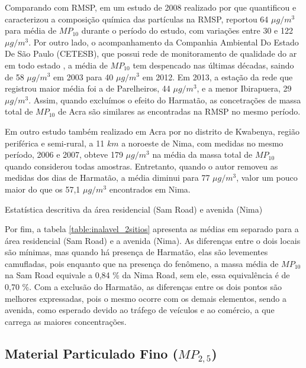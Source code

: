 Comparando com RMSP, em um estudo de 2008 realizado por \citet{souza2014}
que quantificou e caracterizou a composição química das partículas na RMSP,
reportou 64 $\mu g / m^3$ para média de $MP_{10}$ durante o período do estudo, 
com variações entre 30 e 122 $\mu g / m^3$. Por outro lado, o acompanhamento 
da Companhia Ambiental Do Estado De São Paulo (CETESB), que possui 
rede de monitoramento de qualidade do ar em todo estado \citep{cetesb2014}, 
a média de $MP_{10}$ tem despencado nas últimas décadas, saindo de 58 
$\mu g / m^3$ em 2003 para 40 $\mu g / m^3$ em 2012. Em 2013, a estação da rede
que registrou maior média foi a de Parelheiros, 44 $\mu g / m^3$, e a menor 
Ibirapuera, 29 $\mu g / m^3$. Assim, quando excluímos o efeito do Harmatão, 
as concetrações de massa total de $MP_{10}$ de Acra são similares as encontradas
na RMSP no mesmo período.

Em outro estudo também realizado em Acra por \citet{aboh2009} no distrito de 
Kwabenya, região periférica e semi-rural, a 11 $km$ a noroeste de Nima, com 
medidas no mesmo período, 2006 e 2007, obteve 179 $\mu g / m^3$ 
na média da massa total de $MP_{10}$ quando considerou todas amostras. 
Entretanto, quando o autor removeu as medidas dos dias de Harmatão, 
a média diminui para 77 $\mu g / m^3$,
valor um pouco maior do que os 57,1 $\mu g/ m^3$ encontrados em Nima.

\begin{table}[H]
  \centering
    
  \caption{Estatística descritiva da área residencial (Sam Road) e avenida (Nima) 
           \label{table:inalavel_2sitios}}
\end{table}

Por fim, a tabela \ref{table:inalavel_2sitios} apresenta as médias em separado
para a área residencial (Sam Road) e a avenida (Nima). As diferenças 
entre o dois locais são mínimas, mas quando há presença de Harmatão, 
elas são levementes camufladas, pois enquanto que na presença do fenômeno, 
a massa média de $MP_{10}$ na Sam Road equivale a 0,84 \% da Nima Road, 
sem ele, essa equivalência é de 0,70 \%. Com a exclusão do Harmatão, as 
diferenças entre os dois pontos são melhores expressadas, pois o mesmo ocorre 
com os demais elementos, sendo a avenida, como esperado devido ao tráfego de 
veículos e ao comércio, a que carrega as maiores concentrações.

\newpage
\subsection{Material Particulado Fino ($MP_{2,5}$)}

